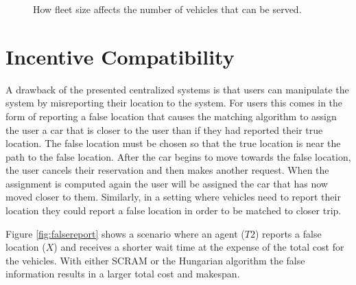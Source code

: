 \documentclass[letterpaper]{article}
\begin{document}
\begin{figure}
\label{fleetSizeGraph}
\caption{How fleet size affects the number of vehicles that can be served.}
\end{figure}

\section{Incentive Compatibility}

A drawback of the presented centralized systems is that users can manipulate the system by misreporting their location to the system. For users this comes in the form of reporting a false location that causes the matching algorithm to assign the user a car that is closer to the user than if they had reported their true location. The false location must be chosen so that the true location is near the path to the false location. After the car begins to move towards the false location, the user cancels their reservation and then makes another request. When the assignment is computed again the user will be assigned the car that has now moved closer to them. Similarly, in a setting where vehicles need to report their location they could report a false location in order to be matched to closer trip. 

Figure \ref{fig:falsereport} shows a scenario where an agent ($T2$) reports a false location ($X$) and receives a shorter wait time at the expense of the total cost for the vehicles. With either SCRAM or the Hungarian algorithm the false information results in a larger total cost and makespan.
\end{document}
